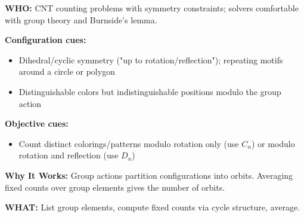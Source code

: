 \documentclass[12pt]{article}
\begin{document}
\textbf{WHO:} CNT counting problems with symmetry constraints; solvers comfortable with group theory and Burnside's lemma.

\textbf{Configuration cues:}
\begin{itemize}
    \item Dihedral/cyclic symmetry ("up to rotation/reflection"); repeating motifs around a circle or polygon
    \item Distinguishable colors but indistinguishable positions modulo the group action
\end{itemize}

\textbf{Objective cues:}
\begin{itemize}
    \item Count distinct colorings/patterns modulo rotation only (use $C_n$) or modulo rotation and reflection (use $D_n$)
\end{itemize}

\textbf{Why It Works:} Group actions partition configurations into orbits. Averaging fixed counts over group elements gives the number of orbits.

\textbf{WHAT:} List group elements, compute fixed counts via cycle structure, average.
\end{document}
